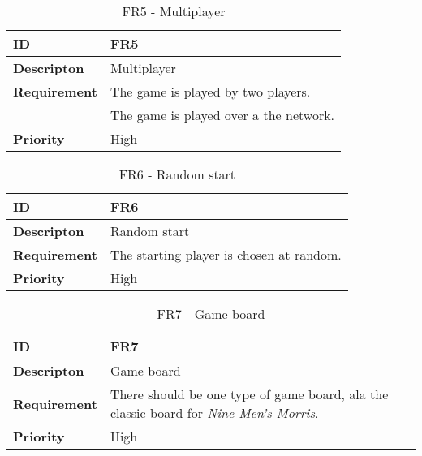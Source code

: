 \begin{table}[h!]
\begin{tabular}{ | p{90pt} | p{270pt}  |}
\hline
\bf ID &  FR5  \\ \hline
\bf Descripton & Multiplayer \\ \hline 
\bf Requirement & The game is played by two players.  \\   
& The game is played over a the network. \\  \hline
\bf Priority & High \\ \hline

\end{tabular}

\caption{FR5 - Multiplayer}

\end{table}


\begin{table}[h!]
\begin{tabular}{ | p{90pt} | p{270pt}  |}
\hline
\bf ID &  FR6  \\ \hline
\bf Descripton & Random start \\ \hline 
\bf Requirement & The starting player is chosen at random. \\ \hline
\bf Priority & High \\ \hline

\end{tabular}

\caption{FR6 - Random start}

\end{table}


\begin{table}[h!]
\begin{tabular}{ | p{90pt} | p{270pt}  |}
\hline
\bf ID &  FR7  \\ \hline
\bf Descripton & Game board \\ \hline 
\bf Requirement & There should be one type of game board, ala the \newline classic board for \emph{Nine Men's Morris}.\\ \hline
\bf Priority & High \\ \hline

\end{tabular}

\caption{FR7 - Game board}

\end{table}

